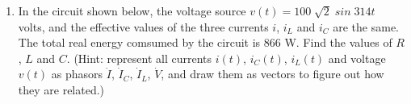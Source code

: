 \begin{enumerate}
\item 
In the circuit shown below, the voltage source $v(t)=100\;\sqrt{2}\;sin\;314t\;$ volts,
and the effective values of the three currents $i$, $i_L$ and $i_C$ are the same. The
total real energy comsumed by the circuit is 866 W. Find the values of $R$, $L$ and $C$.
(Hint: represent all currents $i(t)$, $i_C(t)$, $i_L(t)$ and voltage $v(t)$ as phasors 
$\dot{I}$, $\dot{I}_C$, $\dot{I}_L$, $\dot{V}$, and draw them as vectors to figure out
how they are related.)



%



\end{enumerate}
